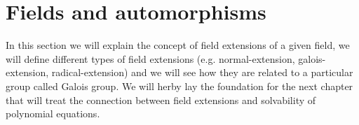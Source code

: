 \section{Fields and automorphisms}
In this section we will explain the concept of field extensions of a given field, we 
will define different types of field extensions (e.g. normal-extension, galois-extension,
radical-extension) and we will see how they are related to a particular group called 
Galois group. We will herby lay the foundation for the next chapter that will treat the 
connection between field extensions and solvability of polynomial equations.



